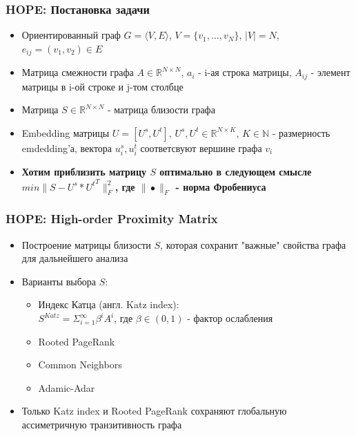 \documentclass[xcolor=table,english]{beamer}
\begin{document}
\begin{frame}[fragile] \frametitle{HOPE: Постановка задачи}
    \begin{itemize}
        \item Ориентированный граф $G = \langle V, E \rangle$, $V = \{ v_1, ... , v_N \}$, $|V| = N$, $e_{ij}=(v_1, v_2) \in E$
        \item Матрица смежности графа $A \in \mathbb{R}^{N \times N}$, $a_i$ - i-ая строка матрицы, $A_{ij}$ - элемент матрицы в i-ой строке и j-том столбце
        \item Матрица $S \in \mathbb{R}^{N \times N}$ - матрица близости графа
        \item Embedding матрицы $U = [U^s, U^t]$, $U^s, U^t \in \mathbb{R}^{N \times K}$, $K \in \mathbb{N}$ - размерность emdedding'а, вектора $u^s_i, u^t_i$ соответсвуют вершине графа $v_i$
        \item \textbf{Хотим приблизить матрицу $S$ оптимально в следующем смысле $min \| S - U^s * {U^t}^T \|^2_F$, где $\| \bullet \|_F$ - норма Фробениуса} 
    \end{itemize}
\end{frame}

\begin{frame}[fragile] \frametitle{HOPE: High-order Proximity Matrix}
    \begin{itemize}
        \item Построение матрицы близости $S$, которая сохранит "важные" свойства графа для дальнейшего анализа
        \item Варианты выбора $S$:
        {
            \begin{itemize}
                \item Индекс Катца (англ. Katz index): \\$S^{Katz} = \Sigma_{i=1}^{\infty} \beta^i A^i$, где $\beta \in (0, 1)$ - фактор ослабления
                \item Rooted PageRank
                \item Common Neighbors
                \item Adamic-Adar
            \end{itemize}
        }
        \item Только Katz index и Rooted PageRank сохраняют глобальную ассиметричную транзитивность графа
    \end{itemize}
\end{frame}
\end{document}
